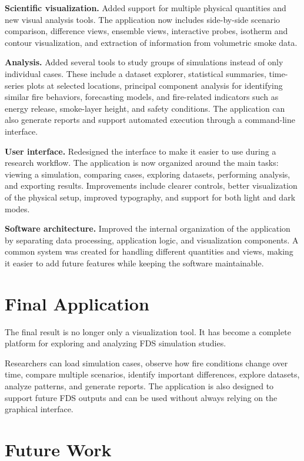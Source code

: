 \documentclass[11pt,a4paper]{article}
\begin{document}
\textbf{Scientific visualization.} Added support for multiple physical quantities and new
visual analysis tools. The application now includes side-by-side scenario comparison,
difference views, ensemble views, interactive probes, isotherm and contour visualization,
and extraction of information from volumetric smoke data.

\textbf{Analysis.} Added several tools to study groups of simulations instead of only
individual cases. These include a dataset explorer, statistical summaries, time-series
plots at selected locations, principal component analysis for identifying similar fire
behaviors, forecasting models, and fire-related indicators such as energy release,
smoke-layer height, and safety conditions. The application can also generate reports and
support automated execution through a command-line interface.

\textbf{User interface.} Redesigned the interface to make it easier to use during a
research workflow. The application is now organized around the main tasks: viewing a
simulation, comparing cases, exploring datasets, performing analysis, and exporting
results. Improvements include clearer controls, better visualization of the physical
setup, improved typography, and support for both light and dark modes.

\textbf{Software architecture.} Improved the internal organization of the application by
separating data processing, application logic, and visualization components. A common
system was created for handling different quantities and views, making it easier to add
future features while keeping the software maintainable.

\section{Final Application}

The final result is no longer only a visualization tool. It has become a complete platform
for exploring and analyzing FDS simulation studies.

Researchers can load simulation cases, observe how fire conditions change over time,
compare multiple scenarios, identify important differences, explore datasets, analyze
patterns, and generate reports. The application is also designed to support future FDS
outputs and can be used without always relying on the graphical interface.

\section{Future Work}
\end{document}
